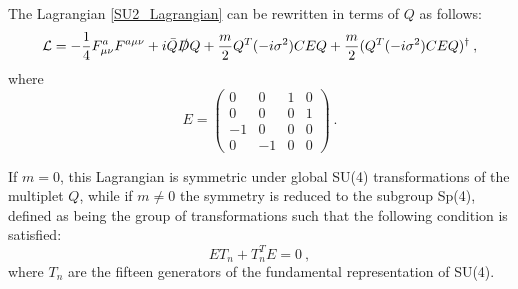 The Lagrangian \ref{SU2_Lagrangian}  can be rewritten in terms of $Q$ as follows:
\begin{equation}
\mathcal L = - \frac{1}{4} F_{\mu\nu}^a F^{a\mu\nu}  + i \bar Q \slashed D Q  + \frac{m}{2} Q^T (-i \sigma^2) C E Q +  \frac{m}{2} (Q^T (-i \sigma^2) C E Q)^{\dagger} \: ,
\label{SU2_Lagrangian2}
\end{equation}
%
where
\begin{equation}
E =
\begin{pmatrix}
0 & 0 & 1 & 0 \\
0 & 0 & 0 & 1 \\
-1 & 0 & 0 & 0 \\
 0 & -1 & 0 & 0
\end{pmatrix} \: .
\end{equation}

If $m=0$, this Lagrangian is symmetric under global SU(4) transformations of the multiplet $Q$, while if $m \neq 0$ the symmetry is reduced to the subgroup Sp(4), defined as being the group of transformations such that the following condition is satisfied:
\begin{equation}
E T_n + T_n^T E = 0\: ,
\end{equation}
%
where $T_n$ are the fifteen generators of the fundamental representation of SU(4).

